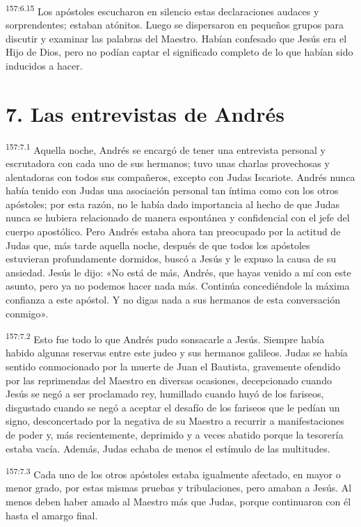 \par
\textsuperscript{157:6.15} Los apóstoles escucharon en silencio estas declaraciones audaces y sorprendentes; estaban atónitos. Luego se dispersaron en pequeños grupos para discutir y examinar las palabras del Maestro. Habían confesado que Jesús era el Hijo de Dios, pero no podían captar el significado completo de lo que habían sido inducidos a hacer.

\section*{7. Las entrevistas de Andrés}
\par
\textsuperscript{157:7.1} Aquella noche, Andrés se encargó de tener una entrevista personal y escrutadora con cada uno de sus hermanos; tuvo unas charlas provechosas y alentadoras con todos sus compañeros, excepto con Judas Iscariote. Andrés nunca había tenido con Judas una asociación personal tan íntima como con los otros apóstoles; por esta razón, no le había dado importancia al hecho de que Judas nunca se hubiera relacionado de manera espontánea y confidencial con el jefe del cuerpo apostólico. Pero Andrés estaba ahora tan preocupado por la actitud de Judas que, más tarde aquella noche, después de que todos los apóstoles estuvieran profundamente dormidos, buscó a Jesús y le expuso la causa de su ansiedad. Jesús le dijo: «No está de más, Andrés, que hayas venido a mí con este asunto, pero ya no podemos hacer nada más. Continúa concediéndole la máxima confianza a este apóstol. Y no digas nada a sus hermanos de esta conversación conmigo».

\par
\textsuperscript{157:7.2} Esto fue todo lo que Andrés pudo sonsacarle a Jesús. Siempre había habido algunas reservas entre este judeo y sus hermanos galileos. Judas se había sentido conmocionado por la muerte de Juan el Bautista, gravemente ofendido por las reprimendas del Maestro en diversas ocasiones, decepcionado cuando Jesús se negó a ser proclamado rey, humillado cuando huyó de los fariseos, disgustado cuando se negó a aceptar el desafío de los fariseos que le pedían un signo, desconcertado por la negativa de su Maestro a recurrir a manifestaciones de poder y, más recientemente, deprimido y a veces abatido porque la tesorería estaba vacía. Además, Judas echaba de menos el estímulo de las multitudes.

\par
\textsuperscript{157:7.3} Cada uno de los otros apóstoles estaba igualmente afectado, en mayor o menor grado, por estas mismas pruebas y tribulaciones, pero amaban a Jesús. Al menos deben haber amado al Maestro más que Judas, porque continuaron con él hasta el amargo final.

